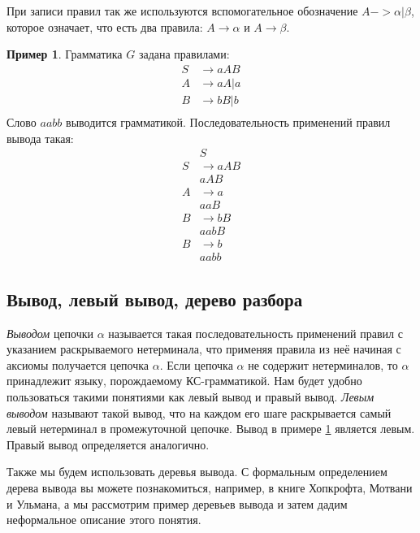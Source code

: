 \documentclass[12pt]{article}
\theoremstyle{definiton}
\theoremstyle{definition}
\newtheorem{Example}{Пример}
\theoremstyle{definition}
\begin{document}
При записи правил так же используются вспомогательное обозначение $A -> \alpha | \beta$, которое означает, что есть два правила: $A \to \alpha$ и $A \to \beta$.

\begin{Example}\label{Gex}
	Грамматика $ G $ задана правилами:
	\begin{align*}
		S &\to aAB\\	
		A &\to aA | a\\
		B &\to bB | b\\
	\end{align*}
	Слово $aabb$ выводится грамматикой. Последовательность применений правил вывода такая:
	\begin{align*}
		&S \\
		S &\to aAB\\
		&aAB\\
		A &\to a\\
		&aaB\\
		B &\to bB\\
		&aabB\\
		B &\to b\\
		&aabb
	\end{align*}
\end{Example}

\subsection{Вывод, левый вывод, дерево разбора}

\emph{Выводом} цепочки $\alpha$ называется такая последовательность применений правил с указанием раскрываемого нетерминала, что применяя правила из неё начиная с аксиомы получается цепочка $\alpha$. Если цепочка $\alpha$ не содержит нетерминалов, то $\alpha$ принадлежит языку, порождаемому КС-грамматикой. Нам будет удобно пользоваться такими понятиями как левый вывод и правый вывод.  \emph{Левым выводом} называют такой вывод, что на каждом его шаге раскрывается самый левый нетерминал в промежуточной цепочке. Вывод в примере \ref{Gex} является левым. Правый вывод определяется аналогично.


Также мы будем использовать деревья вывода. С формальным определением дерева вывода вы можете познакомиться, например, в книге Хопкрофта, Мотвани и Ульмана, а мы рассмотрим пример деревьев вывода и затем дадим неформальное описание этого понятия. 
\end{document}
